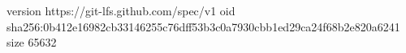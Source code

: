 version https://git-lfs.github.com/spec/v1
oid sha256:0b412e16982cb33146255c76dff53b3c0a7930cbb1ed29ca24f68b2e820a6241
size 65632
